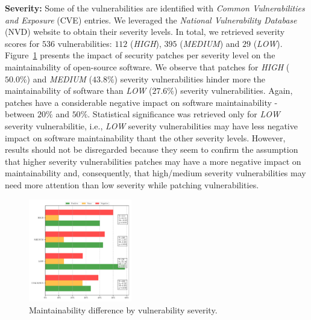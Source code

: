 \documentclass[10pt,conference]{IEEEtran}
\begin{document}
\textbf{Severity:} Some of the vulnerabilities are identified with \emph{Common 
Vulnerabilities and Exposure} (CVE) entries. We leveraged the \emph{National Vulnerability 
Database} (NVD) website to obtain their severity levels. In total, we 
retrieved severity scores for $536$ vulnerabilities: $112$ (\emph{HIGH}), 
$395$ (\emph{MEDIUM}) and $29$ (\emph{LOW}). Figure~\ref{fig:severity} 
presents the impact of security patches per severity level on the 
maintainability of open-source software. We observe that patches for 
\emph{HIGH} ($50.0\%$) and \emph{MEDIUM} ($43.8\%$) severity vulnerabilities 
hinder more the maintainability of software than \emph{LOW} ($27.6\%$) 
severity vulnerabilities. Again, patches have a considerable 
negative impact on software maintainability - between $20\%$ 
and $50\%$. Statistical significance was retrieved only for \emph{LOW}
severity vulnerabilitie, i.e., \emph{LOW} severity vulnerabilities
may have less negative impact on software maintainability thant the 
other severity levels. However, 
results should not be disregarded because they seem to confirm the 
assumption that higher severity vulnerabilities patches may have a 
more negative impact on maintainability and, consequently, that high/medium 
severity vulnerabilities may need more attention than low severity while 
patching vulnerabilities.

\begin{figure}[h]
 	\centering 	\includegraphics[width=0.4\textwidth]{figures/main_per_severity.pdf}
 	\caption{Maintainability difference by vulnerability severity.}
	\label{fig:severity}
\end{figure}
\end{document}

